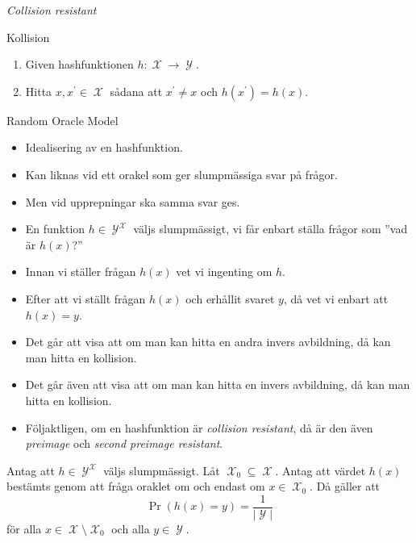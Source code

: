 \documentclass{beamer}
\theoremstyle{definition}
\DeclareMathOperator{\X}{\mathcal{X}}
\DeclareMathOperator{\Y}{\mathcal{Y}}
\begin{document}
\begin{frame}{\insertsubsectionhead}{\emph{Collision resistant}}
  \begin{block}{Kollision}
    \begin{enumerate}
      \item Given hashfunktionen \(h\colon \X\to \Y\).
      \item Hitta \(x, x^\prime\in \X\) sådana att \(x^\prime\neq x\) och 
        \(h(x^\prime) = h(x)\).
    \end{enumerate}
  \end{block}
\end{frame}
\begin{frame}{\insertsubsectionhead}{Random Oracle Model}
  \begin{itemize}
    \item Idealisering av en hashfunktion.
    \item Kan liknas vid ett orakel som ger slumpmässiga svar på frågor.
    \item Men vid upprepningar ska samma svar ges.
    \item En funktion \(h\in \Y^{\X}\) väljs slumpmässigt, vi får enbart ställa 
      frågor som ''vad är \(h(x)\)?''
    \item Innan vi ställer frågan \(h(x)\) vet vi ingenting om \(h\).
    \item Efter att vi ställt frågan \(h(x)\) och erhållit svaret \(y\), då vet 
      vi enbart att \(h(x) = y\).
  \end{itemize}
\end{frame}
\begin{frame}{\insertsubsectionhead}
  \begin{itemize}
    \item Det går att visa att om man kan hitta en andra invers avbildning, då 
      kan man hitta en kollision.
    \item Det går även att visa att om man kan hitta en invers avbildning, då 
      kan man hitta en kollision.
    \item Följaktligen, om en hashfunktion är \emph{collision resistant}, då är 
      den även \emph{preimage} och \emph{second preimage resistant}.
  \end{itemize}
\end{frame}
\begin{frame}{\insertsubsectionhead}
  \begin{theorem}[Oberoendesatsen]
    Antag att \(h\in \Y^{\X}\) väljs slumpmässigt.
    Låt \(\X_0\subseteq \X\).
    Antag att värdet \(h(x)\) bestämts genom att fråga oraklet om och endast om 
    \(x\in \X_0\).
    Då gäller att \[\Pr(h(x) = y) = \frac{1}{|\Y|}\] för alla \(x\in \X 
    \setminus \X_0\) och alla \(y\in \Y\).
  \end{theorem}
\end{frame}
\end{document}
